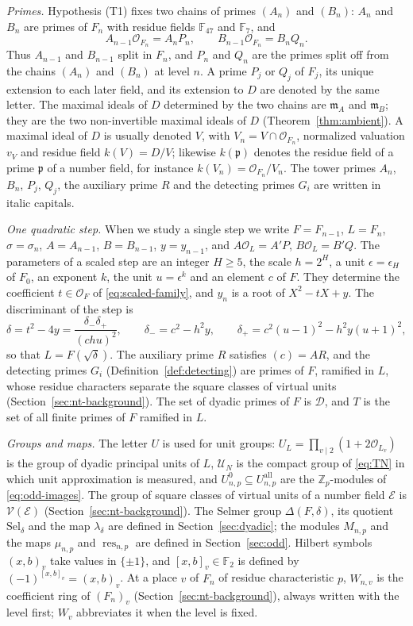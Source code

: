 \documentclass[11pt]{article}
\theoremstyle{plain}
\theoremstyle{definition}
\theoremstyle{remark}
\newcommand{\Z}{\mathbb Z}
\newcommand{\F}{\mathbb F}
\newcommand{\OO}{\mathcal O}
\newcommand{\EA}{\mathfrak m_A}
\newcommand{\EB}{\mathfrak m_B}
\begin{document}
\emph{Primes.}  Hypothesis (T1) fixes two chains of primes $(A_n)$ and
$(B_n)$: $A_n$ and $B_n$ are primes of $F_n$ with residue fields $\F_{47}$
and $\F_7$, and
\[
 A_{n-1}\OO_{F_n}=A_nP_n,\qquad B_{n-1}\OO_{F_n}=B_nQ_n .
\]
Thus $A_{n-1}$ and $B_{n-1}$ split in $F_n$, and $P_n$ and $Q_n$ are the
primes split off from the chains $(A_n)$ and $(B_n)$ at level $n$.  A
prime $P_j$ or $Q_j$ of $F_j$, its unique extension to each later field,
and its extension to $D$ are denoted by the same letter.  The maximal ideals
of $D$ determined by the two chains are $\EA$ and $\EB$; they are the two
non-invertible maximal ideals of $D$ (Theorem~\ref{thm:ambient}).  A
maximal ideal of $D$ is usually denoted $V$, with $V_n=V\cap\OO_{F_n}$,
normalized valuation $v_V$ and residue field $k(V)=D/V$; likewise
$k(\mathfrak p)$ denotes the residue field of a prime $\mathfrak p$ of a
number field, for instance $k(V_n)=\OO_{F_n}/V_n$.  The tower primes $A_n$, $B_n$, $P_j$, $Q_j$,
the auxiliary prime $R$ and the detecting primes $G_i$ are written in
italic capitals.

\emph{One quadratic step.}  When we study a single step we write $F=F_{n-1}$,
$L=F_n$, $\sigma=\sigma_n$, $A=A_{n-1}$, $B=B_{n-1}$, $y=y_{n-1}$, and
$A\OO_L=A'P$, $B\OO_L=B'Q$.  The parameters of a scaled step are an integer
$H\ge5$, the scale $h=2^H$, a unit $\epsilon=\epsilon_H$ of $F_0$, an
exponent $k$, the unit $u=\epsilon^k$ and an element $c$ of $F$.  They
determine the coefficient $t\in\OO_F$ of \eqref{eq:scaled-family}, and
$y_n$ is a root of $X^2-tX+y$.  The discriminant of the step is
\[
 \delta=t^2-4y=\frac{\delta_-\delta_+}{(chu)^2},\qquad
 \delta_-=c^2-h^2y,\qquad
 \delta_+=c^2(u-1)^2-h^2y(u+1)^2,
\]
so that $L=F(\sqrt\delta)$.  The auxiliary prime $R$ satisfies
$(c)=AR$, and the detecting primes $G_i$ (Definition~\ref{def:detecting})
are primes of $F$, ramified in $L$, whose residue characters separate the
square classes of virtual units (Section~\ref{sec:nt-background}).  The set of dyadic primes of $F$ is
$\mathcal D$, and $T$ is the set of all finite primes of $F$ ramified in
$L$.

\emph{Groups and maps.}  The letter $U$ is used for unit groups:
$U_L=\prod_{v\mid2}(1+2\OO_{L_v})$ is the group of dyadic principal units
of $L$, $\mathcal U_N$ is the compact group of \eqref{eq:TN} in which unit
approximation is measured, and $U^0_{n,p}\subseteq U^{\mathrm{all}}_{n,p}$
are the $\Z_p$-modules of \eqref{eq:odd-images}.  The group of square
classes of virtual units of a number field $\mathcal E$ is $\mathcal
V(\mathcal E)$ (Section~\ref{sec:nt-background}).  The Selmer group $\Delta(F,\delta)$,
its quotient $\mathrm{Sel}_\delta$ and the map $\lambda_\delta$ are
defined in Section~\ref{sec:dyadic}; the modules $M_{n,p}$ and the maps
$\mu_{n,p}$ and $\operatorname{res}_{n,p}$ are defined in
Section~\ref{sec:odd}.  Hilbert symbols $(x,b)_v$ take values in
$\{\pm1\}$, and $[x,b]_v\in\F_2$ is defined by
$(-1)^{[x,b]_v}=(x,b)_v$.  At a place $v$ of $F_n$ of residue
characteristic $p$, $W_{n,v}$ is the coefficient ring of $(F_n)_v$
(Section~\ref{sec:nt-background}), always written with the level first;
$W_v$ abbreviates it when the level is fixed.
\end{document}
